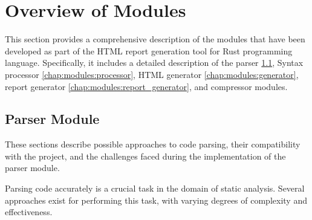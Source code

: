 


\section{Overview of Modules}
\label{meth:modules}
This section provides a comprehensive description of the modules that have been developed as part of the HTML report generation tool for Rust programming language. Specifically, it includes a detailed description of the parser \ref{chap:modules:parser}, Syntax processor \ref{chap:modules:processor}, HTML generator \ref{chap:modules:generator}, report generator \ref{chap:modules:report_generator}, and compressor modules.

\subsection{Parser Module}
\label{chap:modules:parser}

These sections describe possible approaches to code parsing, their compatibility with the project, and the challenges faced during the implementation of the parser module.

Parsing code accurately is a crucial task in the domain of static analysis. Several approaches exist for performing this task, with varying degrees of complexity and effectiveness.


